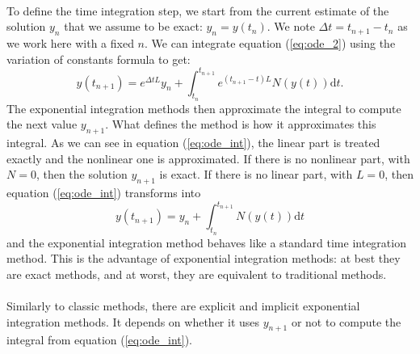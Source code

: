     \paragraph{}
    To define the time integration step, we start from the current estimate of the solution $y_n$ that we assume to be exact: $y_n = y\left(t_n\right)$.
    We note $\Delta t = t_{n+1} - t_n$ as we work here with a fixed $n$.
    We can integrate equation (\ref{eq:ode_2}) using the variation of constants formula to get:
    \begin{equation}\label{eq:ode_int}
      y\left(t_{n+1}\right) = e^{\Delta t L} y_n + \int_{t_n}^{t_{n+1}} e^{\left(t_{n+1} - t\right) L} N\left(y\left(t\right)\right) \mathrm{d}t .
    \end{equation}
    The exponential integration methods then approximate the integral to compute the next value $y_{n+1}$.
    What defines the method is how it approximates this integral.
    As we can see in equation (\ref{eq:ode_int}), the linear part is treated exactly and the nonlinear one is approximated.
    If there is no nonlinear part, with $N = 0$, then the solution $y_{n+1}$ is exact.
    If there is no linear part, with $L = 0$, then equation (\ref{eq:ode_int}) transforms into
    \begin{equation}\label{eq:ode_int_classic}
      y\left(t_{n+1}\right) = y_n + \int_{t_n}^{t_{n+1}} N\left(y\left(t\right)\right) \mathrm{d}t
    \end{equation}
    and the exponential integration method behaves like a standard time integration method.
    This is the advantage of exponential integration methods: at best they are exact methods, and at worst, they are equivalent to traditional methods.

    \paragraph{}
    Similarly to classic methods, there are explicit \cite{BhattKhaliqWade2018} and implicit \cite{NieZhangZhao2006} exponential integration methods.
    It depends on whether it uses $y_{n+1}$ or not to compute the integral from equation (\ref{eq:ode_int}).

